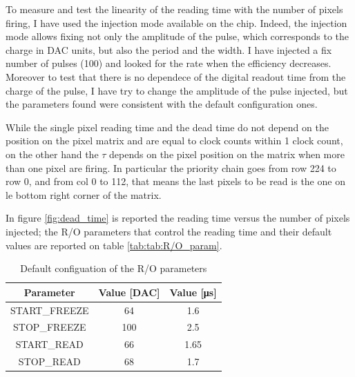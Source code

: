         To measure and test the linearity of the reading time with the number of pixels firing, I have used the injection mode available on the chip. 
        Indeed, the injection mode allows fixing not only the amplitude of the pulse, which corresponds to the charge in DAC units, but also the period and the width.
        I have injected a fix number of pulses (100) and looked for the rate when the efficiency decreases. 
        Moreover to test that there is no dependece of the digital readout time from the charge of the pulse, I have try to change the amplitude of the pulse injected, but the parameters found were consistent with the default configuration ones.

        
        While the single pixel reading time and the dead time do not depend on the position on the pixel matrix and are equal to  clock counts within 1 clock count, on the other hand the $\tau$ depends on the pixel position on the matrix when more than one pixel are firing. 
        In particular the priority chain goes from row 224 to row 0, and from col 0 to 112, that means the last pixels to be read is the one on le bottom right corner of the matrix. 

        In figure \ref{fig:dead_time} is reported the reading time versus the number of pixels injected; the R/O parameters that control the reading time and their default values are reported on table \ref{tab:tab:R/O_param}.
        \begin{table}
            \begin{center}
            \begin{tabular}{|c | c | c |}
            \hline
            Parameter & Value [\si{DAC}] & Value [\si{\us}]\\
            \hline
            \hline
            START\_FREEZE & 64 & 1.6\\
            STOP\_FREEZE & 100 & 2.5\\
            START\_READ & 66 & 1.65\\
            STOP\_READ & 68 & 1.7\\
            \hline
            \end{tabular}
            \caption{Default configuation of the R/O parameters}
            \label{tab:R/O_param}
            \end{center}
        \end{table}

